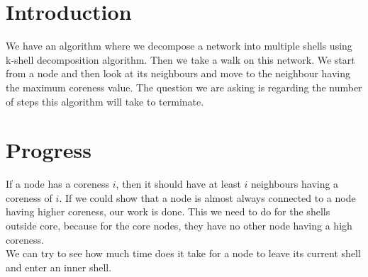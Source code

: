 \documentclass{exam}
\begin{document}
\begin{center}
\end{center}
 
\vspace{5mm}
 
 
%
% 
%

\section{Introduction}

We have an algorithm where we decompose a network into multiple shells using k-shell decomposition algorithm. Then we take a walk on this network. We start from a node and then look at its neighbours and move to the neighbour having the maximum coreness value. The question we are asking is regarding the number of steps this algorithm will take to terminate. 

\section{Progress}
If a node has a coreness $i$, then it should have at least $i$ neighbours having a coreness of $i$. If we could show that a node is almost always connected to a node having higher coreness, our work is done. This we need to do for the shells outside core, because for the core nodes, they have no other node having a high coreness. \\

We can try to see how much time does it take for a node to leave its current shell and enter an inner shell. 
\end{document}

